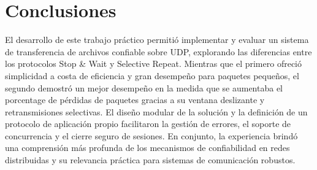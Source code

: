 \section{Conclusiones}

El desarrollo de este trabajo práctico permitió implementar y evaluar un sistema de transferencia de archivos confiable sobre UDP, explorando las diferencias entre los protocolos Stop \& Wait y Selective Repeat. Mientras que el primero ofreció simplicidad a costa de eficiencia y gran desempeño para paquetes pequeños, el segundo demostró un mejor desempeño en la medida que se aumentaba el porcentage de pérdidas de paquetes gracias a su ventana deslizante y retransmisiones selectivas. El diseño modular de la solución y la definición de un protocolo de aplicación propio facilitaron la gestión de errores, el soporte de concurrencia y el cierre seguro de sesiones. En conjunto, la experiencia brindó una comprensión más profunda de los mecanismos de confiabilidad en redes distribuidas y su relevancia práctica para sistemas de comunicación robustos.